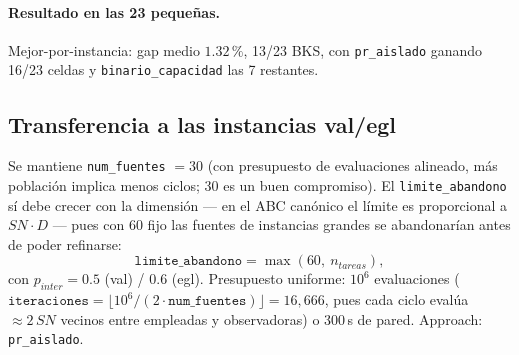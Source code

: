 \paragraph{Resultado en las 23 pequeñas.} Mejor-por-instancia: gap medio
$1.32\,\%$, 13/23 BKS, con \texttt{pr\_aislado} ganando 16/23 celdas y
\texttt{binario\_capacidad} las 7 restantes.

\subsection{Transferencia a las instancias val/egl}
Se mantiene \texttt{num\_fuentes} $= 30$ (con presupuesto de evaluaciones
alineado, más población implica menos ciclos; 30 es un buen compromiso). El
\texttt{limite\_abandono} sí debe crecer con la dimensión --- en el ABC
canónico el límite es proporcional a $SN \cdot D$ --- pues con 60 fijo las
fuentes de instancias grandes se abandonarían antes de poder refinarse:
\[
  \texttt{limite\_abandono} = \max(60,\ n_{tareas}),
\]
con $p_{inter} = 0.5$ (val) / $0.6$ (egl). Presupuesto uniforme: $10^6$
evaluaciones ($\texttt{iteraciones} = \lfloor 10^6 / (2 \cdot
\texttt{num\_fuentes}) \rfloor = 16{,}666$, pues cada ciclo evalúa
$\approx 2\,SN$ vecinos entre empleadas y observadoras) o 300\,s de pared.
Approach: \texttt{pr\_aislado}.
